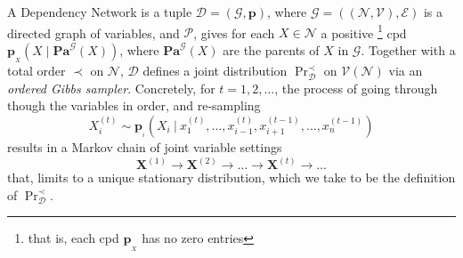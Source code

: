 \documentclass[letterpaper]{article} %
\theoremstyle{plain}
\theoremstyle{definition}
\theoremstyle{remark}
\newcommand\mat[1]{\mathbf{#1}}
\newcommand\Pa{\mathbf{Pa}}
\newcommand{\bp}[1][L]{\mat{p}_{\!_{#1}\!}}
\newcommand{\V}{\mathcal V}
\newcommand{\N}{\mathcal N}
\newcommand{\Ed}{\mathcal E}
\newcommand{\Gr}{\mathcal G}
\newcommand{\nvvars}[1][\N,\V]{(#1)}
\begin{document}
\begin{defn}
A Dependency Network is a tuple $\mathcal D = (\Gr, \mat p) $, where $\Gr = (\nvvars,\Ed)$ is a
directed graph of variables, and $\mathcal P$, gives for each $X \in \N$ a positive%
	\footnote{that is, each cpd $\bp[X]$ has no zero entries}
cpd $\bp[X](X \mid \Pa^{\Gr}(X))$, where $\Pa^{\Gr}(X)$ are the parents of $X$ in $\Gr$.
Together with a total order $\prec$ on $\N$,
$\mathcal D$ defines a joint distribution $\Pr^\prec_{\mathcal D}$ on $\V(\N)$ via an \emph{ordered Gibbs sampler}. Concretely, for $t= 1,2, \ldots$, the process of going through though the variables in order, and re-sampling
\[
	 X_i^{(t)} \sim \bp[i]\left(X_i ~\big|~ x_1^{(t)}, \ldots, x_{i-1}^{(t)}, x_{i+1}^{(t-1)}, \ldots, x^{(t-1)}_{n} \right) 
\]
results in a Markov chain of joint variable settings
\[ \mat X^{(1)} \to \mat X^{(2)} \to \ldots \to \mat X^{(t)} \to \ldots \]
that, %
limits to a unique stationary distribution, which we take to be the definition of $\Pr^\prec_{\mathcal D}$.
\end{defn}

%
\end{document}
